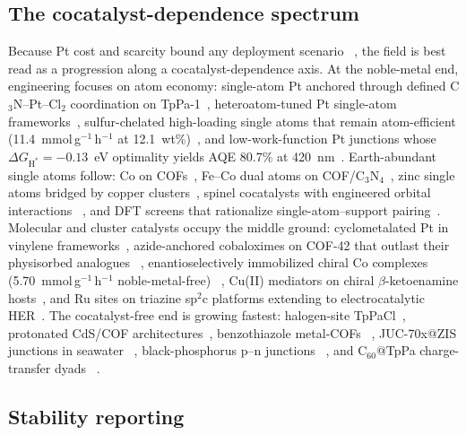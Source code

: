 \subsection{The cocatalyst-dependence spectrum}

Because Pt cost and scarcity bound any deployment scenario
~\cite{qu2024covalent}, the field is best read as a progression along a
cocatalyst-dependence axis. At the noble-metal end, engineering focuses on
atom economy: single-atom Pt anchored through defined
C$_3$N--Pt--Cl$_2$ coordination on TpPa-1~\cite{dong2021platinum},
heteroatom-tuned Pt single-atom frameworks~\cite{tang2025engineering},
sulfur-chelated high-loading single atoms that remain atom-efficient
(11.4~mmol\,g$^{-1}$\,h$^{-1}$ at 12.1~wt\%)~\cite{chen2024low}, and
low-work-function Pt junctions whose $\Delta G_{\mathrm{H}^*}=-0.13$~eV
optimality yields AQE 80.7\% at 420~nm~\cite{qiu2026atomically}.
Earth-abundant single atoms follow: Co on COFs~\cite{wang2024single},
Fe--Co dual atoms on COF/C$_3$N$_4$~\cite{osemba2026synergistic},
zinc single atoms bridged by copper clusters~\cite{wang2026trinuclear},
spinel cocatalysts with engineered orbital interactions
~\cite{zhang2026electronic}, and DFT screens that rationalize
single-atom--support pairing~\cite{younas2024a,niu2023review}. Molecular
and cluster catalysts occupy the middle ground: cyclometalated Pt in
vinylene frameworks~\cite{jiao2026cyclometalated}, azide-anchored
cobaloximes on COF-42 that outlast their physisorbed analogues
~\cite{gottschling2020rational}, enantioselectively immobilized chiral Co
complexes (5.70~mmol\,g$^{-1}$\,h$^{-1}$ noble-metal-free)
~\cite{huang2025enantioselective}, Cu(II) mediators on chiral
$\beta$-ketoenamine hosts~\cite{weng2022the}, and Ru sites on triazine
sp$^2$c platforms extending to electrocatalytic HER~\cite{zhao2022ruthenium,
yu2024vinyl,zhao2025covalent}. The cocatalyst-free end is growing fastest:
halogen-site TpPaCl~\cite{ma2025engineering}, protonated CdS/COF
architectures~\cite{duan2024protonated}, benzothiazole metal-COFs
~\cite{zhao2025cocatalyst}, JUC-70x@ZIS junctions in seawater
~\cite{zhang2025dual,zhang2025dualx}, black-phosphorus p--n junctions
~\cite{yan2023metal}, and C$_{60}$@TpPa charge-transfer dyads
~\cite{yupeng2026c}.

\subsection{Stability reporting}

